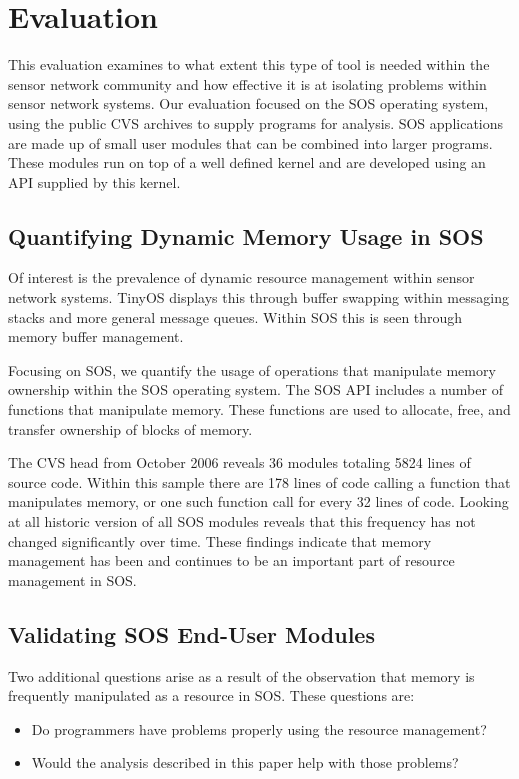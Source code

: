 \section{Evaluation}
\label{sec:eval}

This evaluation examines to what extent this type of tool is needed
within the sensor network community and how effective it is at
isolating problems within sensor network systems.  Our evaluation
focused on the SOS operating system, using the public CVS archives to
supply programs for analysis.  SOS applications are made up of small
user modules that can be combined into larger programs.  These modules
run on top of a well defined kernel and are developed using an API
supplied by this kernel.


\subsection{Quantifying Dynamic Memory Usage in SOS}

Of interest is the prevalence of dynamic resource management within
sensor network systems.  TinyOS displays this through buffer swapping
within messaging stacks and more general message queues.  Within SOS
this is seen through memory buffer management.  

Focusing on SOS, we quantify the usage of operations that manipulate
memory ownership within the SOS operating system.  The SOS API
includes a number of functions that manipulate memory.  These
functions are used to allocate, free, and transfer ownership of blocks
of memory.  

The CVS head from October 2006 reveals 36 modules totaling 5824 lines
of source code.  Within this sample there are 178 lines of code
calling a function that manipulates memory, or one such function call
for every 32 lines of code.  Looking at all historic version of all
SOS modules reveals that this frequency has not changed significantly
over time.  These findings indicate that memory management has been
and continues to be an important part of resource management in SOS.


\subsection{Validating SOS End-User Modules}

Two additional questions arise as a result of the observation that
memory is frequently manipulated as a resource in SOS.  These
questions are:
%
\begin{itemize}
%
\item Do programmers have problems properly using the resource
management?
%
\item Would the analysis described in this paper help with
those problems?
%
\end{itemize}

